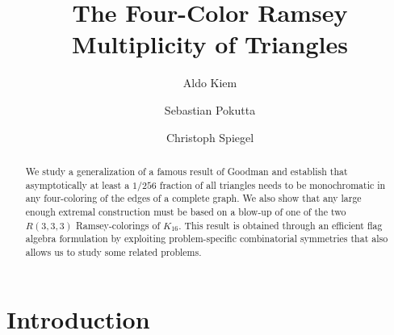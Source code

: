 \documentclass[a4paper,11pt]{article}
\numberwithin{equation}{section}
\begin{document}
%
\title{The Four-Color Ramsey Multiplicity of Triangles}
%
\author[1,2]{Aldo Kiem}
\author[1,2]{Sebastian Pokutta}
\author[1,2]{Christoph Spiegel}
%
\maketitle              %
%
\begin{abstract}
    We study a generalization of a famous result of Goodman and establish that asymptotically at least a $1/256$ fraction of all triangles needs to be monochromatic in any four-coloring of the edges of a complete graph. We also show that any large enough extremal construction must be based on a blow-up of one of the two $R(3,3,3)$ Ramsey-colorings of $K_{16}$. This result is obtained through an efficient flag algebra formulation by exploiting problem-specific combinatorial symmetries that also allows us to study some related problems.
\end{abstract}
%
%
%

\section{Introduction}\label{sec:introduction}
\end{document}
